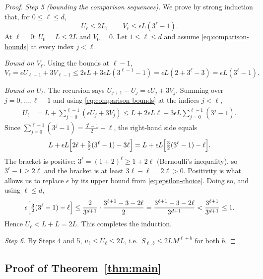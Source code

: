 \documentclass[11pt]{article}
\theoremstyle{definition}
\theoremstyle{remark}
\begin{document}
\begin{proof}
\emph{Step 5 (bounding the comparison sequences).} We prove by strong
induction that, for \(0\leq\ell\leq d\),
\begin{equation}
\label{eq:comparison-bounds}
 U_\ell\leq2L,
 \qquad
 V_\ell\leq\epsilon L(3^\ell-1).
\end{equation}
At \(\ell=0\): \(U_0=L\le 2L\) and \(V_0=0\). Let \(1\leq\ell\leq d\) and
assume \eqref{eq:comparison-bounds} at every index \(j<\ell\).

\emph{Bound on \(V_\ell\).} Using the bounds at \(\ell-1\),
\[
 V_\ell=\epsilon U_{\ell-1}+3V_{\ell-1}
 \leq 2\epsilon L+3\epsilon L(3^{\ell-1}-1)
 =\epsilon L(2+3^\ell-3)=\epsilon L(3^\ell-1).
\]

\emph{Bound on \(U_\ell\).} The recursion says
\(U_{j+1}-U_{j}=\epsilon U_{j}+3V_{j}\). Summing over \(j=0,\ldots,\ell-1\)
and using \eqref{eq:comparison-bounds} at the indices \(j<\ell\),
\begin{align*}
 U_\ell
 &=L+\sum_{j=0}^{\ell-1}(\epsilon U_j+3V_j)
 \leq L+2\epsilon L\ell
          +3\epsilon L\sum_{j=0}^{\ell-1}(3^j-1).
\end{align*}
Since \(\sum_{j=0}^{\ell-1}(3^j-1)=\frac{3^\ell-1}{2}-\ell\), the right-hand
side equals
\[
 L+\epsilon L\Bigl[2\ell+\tfrac32(3^\ell-1)-3\ell\Bigr]
 =L+\epsilon L\Bigl[\tfrac32(3^\ell-1)-\ell\Bigr].
\]
The bracket is positive: \(3^\ell=(1+2)^\ell\ge1+2\ell\) (Bernoulli's
inequality), so \(3^\ell-1\ge2\ell\) and the bracket is at least
\(3\ell-\ell=2\ell>0\). Positivity is what allows us to replace
\(\epsilon\) by its upper bound from \eqref{eq:epsilon-choice}. Doing so,
and using \(\ell\le d\),
\[
 \epsilon\Bigl[\tfrac32(3^\ell-1)-\ell\Bigr]
 \leq\frac{2}{3^{d+1}}\cdot\frac{3^{\ell+1}-3-2\ell}{2}
 =\frac{3^{\ell+1}-3-2\ell}{3^{d+1}}
 <\frac{3^{\ell+1}}{3^{d+1}}\le1 .
\]
Hence \(U_\ell<L+L=2L\). This completes the induction.

\emph{Step 6.} By Steps 4 and 5, \(u_\ell\le U_\ell\leq2L\), i.e.\
\(S_{\ell,b}\le 2LM^{\ell+b}\) for both \(b\).
\end{proof}

\subsection{Proof of Theorem~\ref{thm:main}}
\label{sec:mainproof}
\end{document}
